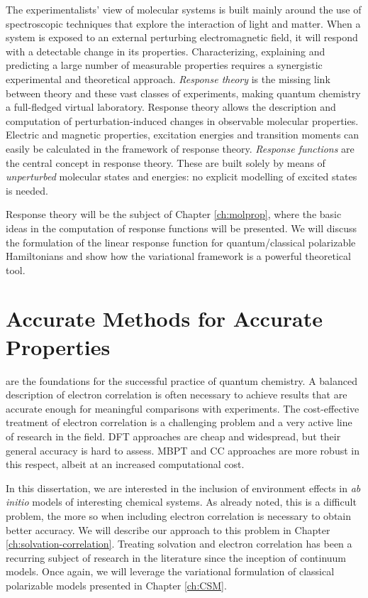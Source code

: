 The experimentalists' view of molecular systems is built mainly around
the use of spectroscopic techniques that explore the interaction of
light and matter. When a system is exposed to an external perturbing
electromagnetic field, it will respond with a detectable change in its
properties.\autocite{Pedersen2012-il, Jaszunski2012-wy}
Characterizing, explaining and predicting a large number of measurable
properties requires a synergistic experimental and theoretical approach.
\emph{Response theory} is the missing link between theory and
these vast classes of
experiments, making quantum chemistry a full-fledged virtual laboratory.
Response theory allows the description and computation of
perturbation-induced changes in observable molecular properties.
Electric and magnetic properties, excitation energies and transition
moments can easily be calculated in the framework of response theory.
\emph{Response functions} are the central concept in response theory.
These are built solely by means of \emph{unperturbed} molecular states and
energies: no explicit modelling of excited states is needed.

Response theory will be the subject of Chapter \ref{ch:molprop},
where the basic ideas in the computation of response functions will be
presented. We will discuss the formulation of the linear response
function for quantum/classical polarizable Hamiltonians and show how the
variational framework is a powerful theoretical tool.

\section*{Accurate Methods for Accurate Properties}

 are the foundations for the successful practice of quantum
chemistry.
A balanced description of electron correlation is often necessary
to achieve results that are accurate enough for meaningful comparisons
with experiments.\autocite{Lee1995-pw, Helgaker2004-oz, Tajti2004-ye}
The cost-effective treatment of electron correlation is a challenging
problem and a very active line of research in the field.
\Acrlong*{DFT} approaches are cheap and widespread, but their general
accuracy is hard to assess. \Acrlong*{MBPT} and \acrlong{CC} approaches
are more robust in this respect, albeit at an increased computational
cost.

In this dissertation, we are interested in the inclusion of
environment effects in \emph{ab initio} models of interesting chemical
systems. As already noted, this is a difficult problem, the more so
when including electron correlation is necessary to obtain better
accuracy.
We will describe our approach to this problem in Chapter
\ref{ch:solvation-correlation}. Treating solvation and electron
correlation has been a recurring subject of research in the literature
since the inception of continuum models. Once again, we will leverage
the variational formulation of classical polarizable models presented
in Chapter \ref{ch:CSM}.
